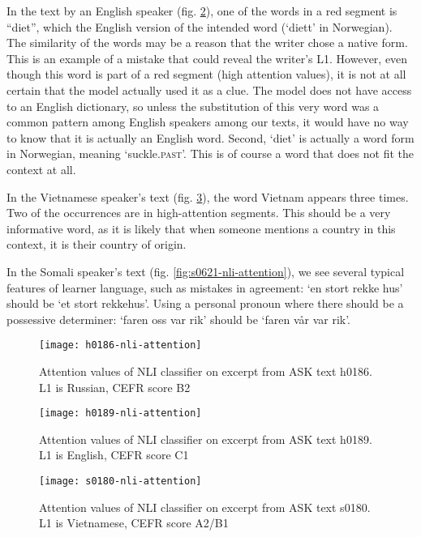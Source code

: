 In the text by an English speaker (fig. \ref{fig:h0189-nli-attention}), one
of the words in a red segment is ``diet'', which the English version of the
intended word (`diett' in Norwegian). The similarity of the words may be a
reason that the writer chose a native form. This is an example of a mistake
that could reveal the writer's \ac{L1}. However, even though this word is
part of a red segment (high attention values), it is not at all certain that
the model actually used it as a clue. The model does not have access to an
English dictionary, so unless the substitution of this very word was a common
pattern among English speakers among our texts, it would have no way to know
that it is actually an English word. Second, `diet' is actually a word form
in Norwegian, meaning `suckle.\textsc{past}'. This is of course a word that
does not fit the context at all.

In the Vietnamese speaker's text (fig. \ref{fig:s0180-nli-attention}), the
word Vietnam appears three times. Two of the occurrences are in
high-attention segments. This should be a very informative word, as it is
likely that when someone mentions a country in this context, it is their
country of origin.

In the Somali speaker's text (fig. \ref{fig:s0621-nli-attention}), we see
several typical features of learner language, such as mistakes in agreement:
`en stort rekke hus' should be `et stort rekkehus'. Using a personal pronoun
where there should be a possessive determiner: `faren oss var rik' should be
`faren vår var rik'.

\begin{figure}
  \centering
  \texttt{[image: h0186-nli-attention]}
  \caption{Attention values of NLI classifier on excerpt from ASK text h0186.
           L1 is Russian, CEFR score B2}
  \label{fig:h0186-nli-attention}
\end{figure}

\begin{figure}
  \centering
  \texttt{[image: h0189-nli-attention]}
  \caption{Attention values of NLI classifier on excerpt from ASK text h0189.
           L1 is English, CEFR score C1}
  \label{fig:h0189-nli-attention}
\end{figure}

\begin{figure}
  \centering
  \texttt{[image: s0180-nli-attention]}
  \caption{Attention values of NLI classifier on excerpt from ASK text s0180.
           L1 is Vietnamese, CEFR score A2/B1}
  \label{fig:s0180-nli-attention}
\end{figure}

